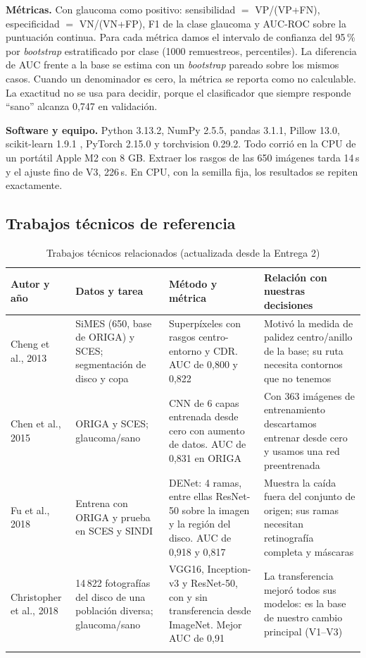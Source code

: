 \documentclass[pdflatex,sn-mathphys-num]{sn-jnl}%
\theoremstyle{thmstyleone}%
\theoremstyle{thmstyletwo}%
\theoremstyle{thmstylethree}%
\begin{document}
\textbf{Métricas.} Con glaucoma como positivo: sensibilidad $=$ VP/(VP+FN), especificidad $=$ VN/(VN+FP), F1 de la clase glaucoma y AUC-ROC \cite{fawcett2006roc} sobre la puntuación continua. Para cada métrica damos el intervalo de confianza del 95\,\% por \textit{bootstrap} estratificado por clase (1000 remuestreos, percentiles). La diferencia de AUC frente a la base se estima con un \textit{bootstrap} pareado sobre los mismos casos. Cuando un denominador es cero, la métrica se reporta como no calculable. La exactitud no se usa para decidir, porque el clasificador que siempre responde ``sano'' alcanza 0,747 en validación.

\textbf{Software y equipo.} Python 3.13.2, NumPy 2.5.5, pandas 3.1.1, Pillow 13.0, scikit-learn 1.9.1 \cite{pedregosa2011scikit}, PyTorch 2.15.0 \cite{paszke2019pytorch} y torchvision 0.29.2. Todo corrió en la CPU de un portátil Apple M2 con 8 GB. Extraer los rasgos de las 650 imágenes tarda 14\,s y el ajuste fino de V3, 226\,s. En CPU, con la semilla fija, los resultados se repiten exactamente.

\subsection{Trabajos técnicos de referencia}

\begin{table}[htbp]
\small
\caption{Trabajos técnicos relacionados (actualizada desde la Entrega 2)}\label{tab:estado}
\begin{tabularx}{\textwidth}{@{}L{2.1cm}YYY@{}}
\toprule
Autor y año & Datos y tarea & Método y métrica & Relación con nuestras decisiones \\
\midrule
Cheng et al., 2013 \cite{cheng2013superpixel} & SiMES (650, base de ORIGA) y SCES; segmentación de disco y copa & Superpíxeles con rasgos centro-entorno y CDR. AUC de 0,800 y 0,822 & Motivó la medida de palidez centro/anillo de la base; su ruta necesita contornos que no tenemos \\
\addlinespace
Chen et al., 2015 \cite{chen2015glaucoma} & ORIGA y SCES; glaucoma/sano & CNN de 6 capas entrenada desde cero con aumento de datos. AUC de 0,831 en ORIGA & Con 363 imágenes de entrenamiento descartamos entrenar desde cero y usamos una red preentrenada \\
\addlinespace
Fu et al., 2018 \cite{fu2018denet} & Entrena con ORIGA y prueba en SCES y SINDI & DENet: 4 ramas, entre ellas ResNet-50 sobre la imagen y la región del disco. AUC de 0,918 y 0,817 & Muestra la caída fuera del conjunto de origen; sus ramas necesitan retinografía completa y máscaras \\
\addlinespace
Christopher et al., 2018 \cite{christopher2018transfer} & 14\,822 fotografías del disco de una población diversa; glaucoma/sano & VGG16, Inception-v3 y ResNet-50, con y sin transferencia desde ImageNet. Mejor AUC de 0,91 & La transferencia mejoró todos sus modelos: es la base de nuestro cambio principal (V1--V3) \\
\botrule
\end{tabularx}
\end{table}
\end{document}
